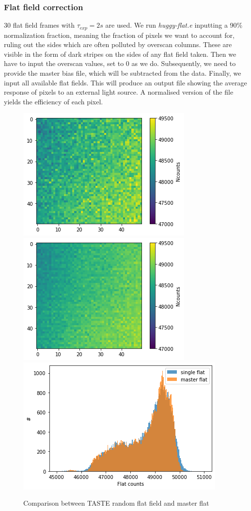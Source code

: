 \documentclass{aa}
\begin{document}
\subsubsection{Flat field correction}
30 flat field frames with $\tau_{exp}=2s$ are used. We run \textit{huggy-flat.e} inputting a 90\% normalization fraction, meaning the fraction of pixels we want to account for, ruling out the sides which are often polluted by overscan columns. These are visible in the form of dark stripes on the sides of any flat field taken. Then we have to input the overscan values, set to 0 as we do. Subsequently, we need to provide the master bias file, which will be subtracted from the data. Finally, we input all available flat fields. This will produce an output file showing the average response of pixels to an external light source. A normalised version of the file yields the efficiency of each pixel.
\begin{figure}[h]
    \centering  
    \includegraphics[scale=0.35, angle=0]{pictures/flat.png}
    \includegraphics[scale=0.35, angle=0]{pictures/master_flat.png}
    \includegraphics[scale=0.45, angle=0]{pictures/flat_comp.png}
    \caption{Comparison between TASTE random flat field and master flat}
\end{figure}
\end{document}
